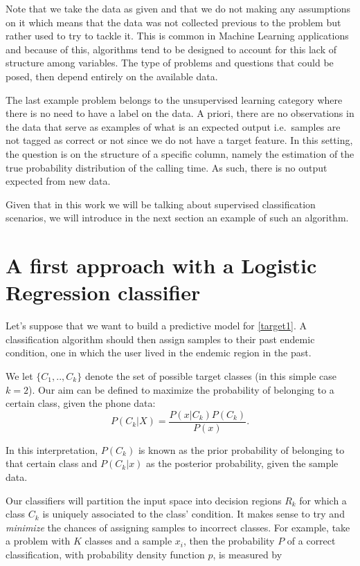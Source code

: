 Note that we take the data as given and that we do not making any assumptions on it which means that the data was not collected previous to the problem but rather used to try to tackle it.
This is common in Machine Learning applications and because of this, algorithms tend to be designed to account for this lack of structure among variables.
The type of problems and questions that could be posed, then depend entirely on the available data.

The last example problem belongs to the unsupervised learning category where there is no need to have a label on the data.
A priori, there are no observations in the data that serve as examples of what is an expected output i.e.\ samples are not tagged as correct or not since we do not have a target feature.
In this setting, the question is on the structure of a specific column, namely the estimation of the true probability distribution of the calling time.
As such, there is no output expected from new data.

Given that in this work we will be talking about supervised classification scenarios, we will introduce in the next section an example of such an algorithm.

\section{A first approach with a Logistic Regression classifier}\label{section-logisticRegression}

Let's suppose that we want to build a predictive model for \cref{target1}.
A classification algorithm should then assign samples to their past endemic condition, one in which the user lived in the endemic region in the past.

We let $\{C_1,..,C_k\}$ denote the set of possible target classes (in this simple case $k=2$).
Our aim can be defined to maximize the probability of belonging to a certain class, given the phone data:
\begin{equation}
P(C_k| X) = \frac{P(x|C_k)P(C_k)}{P(x)} .
\end{equation}

In this interpretation, $P(C_k)$ is known as the prior probability of belonging to that certain class and $P(C_k|x)$ as the posterior probability, given the sample data.

Our classifiers will partition the input space into decision regions $R_k$ for which a class $C_k$ is uniquely associated to the class' condition.
It makes sense to try and \textit{minimize} the chances of assigning samples to incorrect classes.
For example, take a problem with $K$ classes and a sample $x_i$, then the probability $P$ of a correct classification, with probability density function $p$, is measured by


